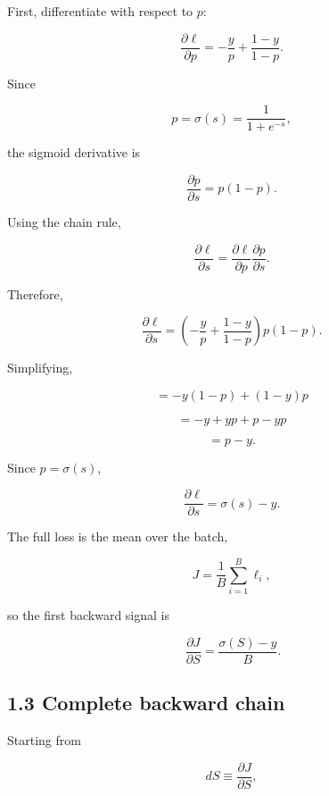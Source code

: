 \documentclass[11pt]{article}
\begin{document}
First, differentiate with respect to $p$:

        \[
          \frac{\partial \ell}{\partial p}
          =
          -\frac{y}{p}
          +
          \frac{1-y}{1-p}.
        \]

Since

        \[
          p=\sigma(s)=\frac{1}{1+e^{-s}},
        \]

the sigmoid derivative is

        \[
          \frac{\partial p}{\partial s}
          =
          p(1-p).
        \]

Using the chain rule,

        \[
          \frac{\partial \ell}{\partial s}
          =
          \frac{\partial \ell}{\partial p}
          \frac{\partial p}{\partial s}.
        \]

Therefore,

        \[
          \frac{\partial \ell}{\partial s}
          =
          \left(
          -\frac{y}{p}
          +
          \frac{1-y}{1-p}
          \right)
          p(1-p).
        \]

Simplifying,

        \[
          =
          -y(1-p)+(1-y)p
        \]

        \[
          =
          -y+yp+p-yp
        \]

        \[
          =
          p-y.
        \]

Since $p=\sigma(s)$,

        \[
          \frac{\partial \ell}{\partial s}
          =
          \sigma(s)-y.
        \]

The full loss is the mean over the batch,

        \[
          J=\frac{1}{B}\sum_{i=1}^{B}\ell_i,
        \]

so the first backward signal is

      \[
        \
        \frac{\partial J}{\partial S}
        =
        \frac{\sigma(S)-y}{B}
        .
      \]

\subsection*{1.3 Complete backward chain}
Starting from

      \[
        dS \equiv \frac{\partial J}{\partial S},
      \]
\end{document}
